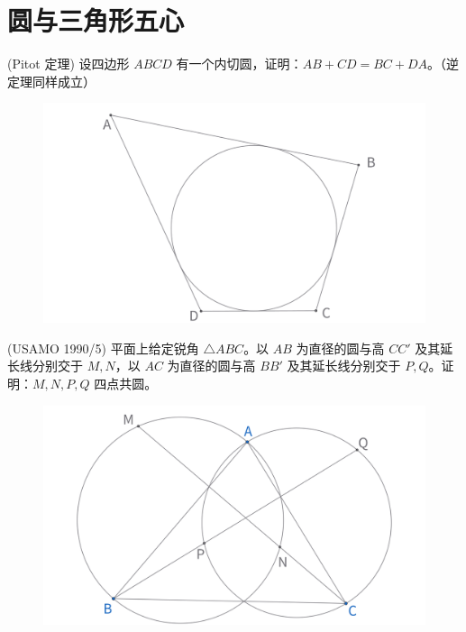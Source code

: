 \section{圆与三角形五心}

\begin{exercise}
    (Pitot 定理) 设四边形 $ABCD$ 有一个内切圆，证明：$AB + CD = BC + DA$。（逆定理同样成立）
\end{exercise}
\begin{figure}[H]
    \centering
    \includegraphics[width=0.7\linewidth]{figures/exercises/225.png}
\end{figure}


\begin{exercise}
    (USAMO 1990/5) 平面上给定锐角 $\triangle ABC$。以 ${AB}$ 为直径的圆与高 ${CC'}$ 及其延长线分别交于 $M, N$，以 ${AC}$ 为直径的圆与高 ${BB'}$ 及其延长线分别交于 $P, Q$。证明：$M, N, P, Q$ 四点共圆。
\end{exercise}
\begin{figure}[H]
    \centering
    \includegraphics[width=0.7\linewidth]{figures/exercises/226.png}
\end{figure}

